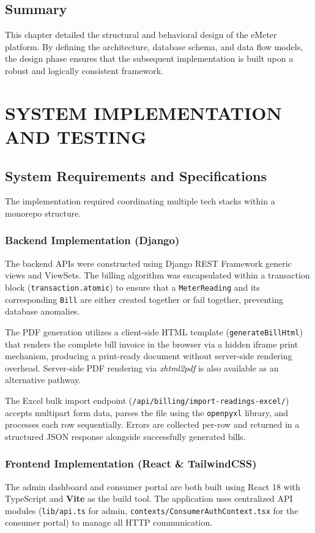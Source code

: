 \documentclass[12pt, a4paper, onecolumn]{report}
\begin{document}
\section{Summary}
This chapter detailed the structural and behavioral design of the eMeter platform. By defining the architecture, database schema, and data flow models, the design phase ensures that the subsequent implementation is built upon a robust and logically consistent framework.

\clearpage
\chapter{SYSTEM IMPLEMENTATION AND TESTING}

\section{System Requirements and Specifications}
The implementation required coordinating multiple tech stacks within a monorepo structure.

\subsection{Backend Implementation (Django)}
The backend APIs were constructed using Django REST Framework generic views and ViewSets. The billing algorithm was encapsulated within a transaction block (\texttt{transaction.atomic}) to ensure that a \texttt{MeterReading} and its corresponding \texttt{Bill} are either created together or fail together, preventing database anomalies. 

The PDF generation utilizes a client-side HTML template (\texttt{generateBillHtml}) that renders the complete bill invoice in the browser via a hidden iframe print mechanism, producing a print-ready document without server-side rendering overhead. Server-side PDF rendering via \textit{xhtml2pdf} is also available as an alternative pathway.

The Excel bulk import endpoint (\texttt{/api/billing/import-readings-excel/}) accepts multipart form data, parses the file using the \texttt{openpyxl} library, and processes each row sequentially. Errors are collected per-row and returned in a structured JSON response alongside successfully generated bills.

\subsection{Frontend Implementation (React \& TailwindCSS)}
The admin dashboard and consumer portal are both built using React 18 with TypeScript and \textbf{Vite} as the build tool. The application uses centralized API modules (\texttt{lib/api.ts} for admin, \texttt{contexts/ConsumerAuthContext.tsx} for the consumer portal) to manage all HTTP communication.
\end{document}
